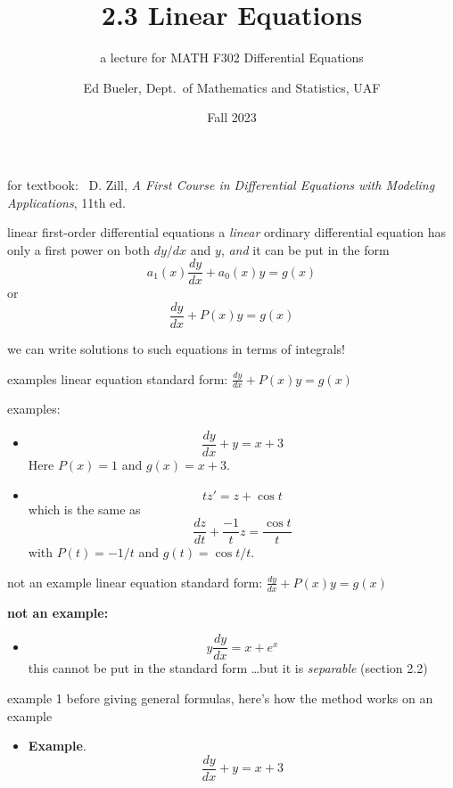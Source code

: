 \documentclass{beamer}
\title{2.3 Linear Equations}
\subtitle{a lecture for MATH F302 Differential Equations}
\author{Ed Bueler, Dept.~of Mathematics and Statistics, UAF}
\date{Fall 2023}
\newcommand{\ds}{\displaystyle}
\begin{document}


\begin{frame}
\titlepage

\centerline{\tiny for textbook: \, D. Zill, \emph{A First Course in Differential Equations with Modeling Applications}, 11th ed.}
\end{frame}


\begin{frame}{linear first-order differential equations}
a \emph{linear} ordinary differential equation has only a first power on both $dy/dx$ and $y$, \emph{and} it can be put in the form
        $$a_1(x) \frac{dy}{dx} + a_0(x) y = g(x)$$
or
        $$\frac{dy}{dx} + P(x) y = g(x)$$

\bigskip
\alert{we can write solutions to such equations in terms of integrals!}
\end{frame}


\begin{frame}{examples}
linear equation standard form: \qquad $\ds \frac{dy}{dx} + P(x) y = g(x)$

\bigskip
examples:
\begin{itemize}
    \item
        $$\frac{dy}{dx} + y = x+3$$
    Here $P(x)=1$ and $g(x) = x+3$.
    \item
        $$t z' = z + \cos t$$
    which is the same as
        $$\frac{dz}{dt} + \frac{-1}{t} z = \frac{\cos t}{t}$$
    with $P(t) = -1/t$ and $g(t)=\cos t/t$.
\end{itemize}
\end{frame}


\begin{frame}{not an example}
linear equation standard form: \qquad $\ds \frac{dy}{dx} + P(x) y = g(x)$

\bigskip
 \textbf{not an example:}
 \begin{itemize}
    \item
        $$y \frac{dy}{dx} = x+e^x$$
    this cannot be put in the standard form \dots but it is \emph{separable} (section 2.2)
\end{itemize}
\end{frame}


\begin{frame}{example 1}
before giving general formulas, here's how the method works on an example

\begin{itemize}
    \item \textbf{Example}.
        $$\frac{dy}{dx} + y = x+3$$
\end{itemize}

\vspace{50mm}
\end{frame}
\end{document}
